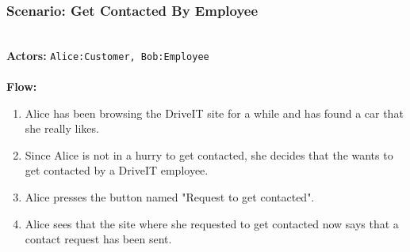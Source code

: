 \subsubsection{Scenario: Get Contacted By Employee}
\HRule \\[0.4cm]
\textbf{Actors:} \texttt{Alice:Customer, Bob:Employee}\\
\HRule \\[0.4cm]
\textbf{Flow:} \\
\begin{enumerate}
    \item Alice has been browsing the DriveIT site for a while and has found a car that she really likes.
    \item Since Alice is not in a hurry to get contacted, she decides that the wants to get contacted by a DriveIT employee. 
    \item Alice presses the button named "Request to get contacted".
    \item Alice sees that the site where she requested to get contacted now says that a contact request has been sent.
\end{enumerate}
\HRule \\[0.4cm]
